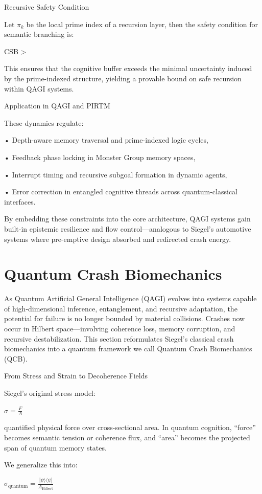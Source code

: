 \documentclass[11pt]{article}
\begin{document}
Recursive Safety Condition

Let $\pi_k$ be the local prime index of a recursion layer, then the safety condition for semantic branching is:

CSB > 

This ensures that the cognitive buffer exceeds the minimal uncertainty induced by the prime-indexed structure, yielding a provable bound on safe recursion within QAGI systems.

Application in QAGI and PIRTM

These dynamics regulate:

• Depth-aware memory traversal and prime-indexed logic cycles,

• Feedback phase locking in Monster Group memory spaces,

• Interrupt timing and recursive subgoal formation in dynamic agents,

• Error correction in entangled cognitive threads across quantum-classical interfaces.

By embedding these constraints into the core architecture, QAGI systems gain built-in epistemic resilience and flow control—analogous to Siegel’s automotive systems where pre-emptive design absorbed and redirected crash energy.

\section{Quantum Crash Biomechanics}
As Quantum Artificial General Intelligence (QAGI) evolves into systems capable of high-dimensional inference, entanglement, and recursive adaptation, the potential for failure is no longer bounded by material collisions. Crashes now occur in Hilbert space—involving coherence loss, memory corruption, and recursive destabilization. This section reformulates Siegel’s classical crash biomechanics into a quantum framework we call Quantum Crash Biomechanics (QCB).

From Stress and Strain to Decoherence Fields

Siegel’s original stress model:

$\sigma = \frac{F}{A}$

quantified physical force over cross-sectional area. In quantum cognition, “force” becomes semantic tension or coherence flux, and “area” becomes the projected span of quantum memory states.

We generalize this into:

$\sigma_{\text{quantum}} = \frac{|\psi \rangle \langle \psi|}{A_{\text{Hilbert}}}$
\end{document}
